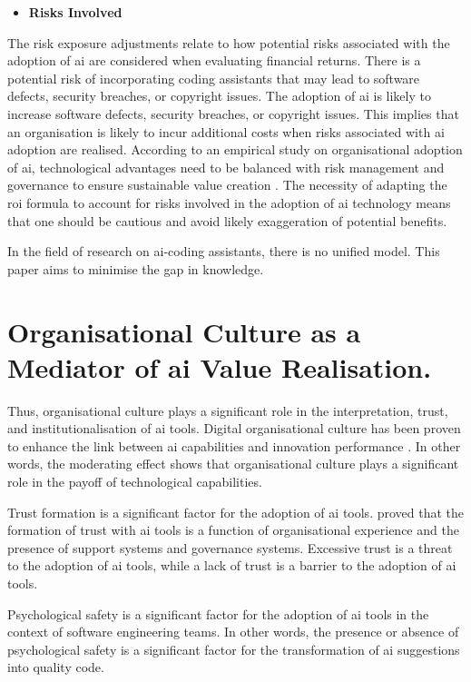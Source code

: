 \begin{itemize}
	\item \textbf{Risks Involved} 
\end{itemize}
The risk exposure adjustments relate to how potential risks associated with the adoption of \gls{ai} are considered when evaluating financial returns. There is a potential risk of incorporating coding assistants that may lead to software defects, security breaches, or copyright issues. The adoption of \gls{ai} is likely to increase software defects, security breaches, or copyright issues. This implies that an organisation is likely to incur additional costs when risks associated with \gls{ai} adoption are realised. According to an empirical study on organisational adoption of \gls{ai}, technological advantages need to be balanced with risk management and governance to ensure sustainable value creation \autocite{Schneider2023}. The necessity of adapting the \gls{roi} formula to account for risks involved in the adoption of \gls{ai} technology means that one should be cautious and avoid likely exaggeration of potential benefits.

In the field of research on \gls{ai}-coding assistants, there is no unified model. This paper aims to minimise the gap in knowledge.

\section {Organisational Culture as a Mediator of \gls{ai} Value Realisation.}
\label{sec:Organisational Culture as a Mediator of AI Value Realisation}
Thus, organisational culture plays a significant role in the interpretation, trust, and institutionalisation of \gls{ai} tools. Digital organisational culture has been proven to enhance the link between \gls{ai} capabilities and innovation performance \autocite{An2024}. In other words, the moderating effect shows that organisational culture plays a significant role in the payoff of technological capabilities.

Trust formation is a significant factor for the adoption of \gls{ai} tools. \textcite{Daly2025} proved that the formation of trust with \gls{ai} tools is a function of organisational experience and the presence of support systems and governance systems. Excessive trust is a threat to the adoption of \gls{ai} tools, while a lack of trust is a barrier to the adoption of \gls{ai} tools.

Psychological safety is a significant factor for the adoption of \gls{ai} tools in the context of software engineering teams. In other words, the presence or absence of psychological safety is a significant factor for the transformation of \gls{ai} suggestions into quality code.

